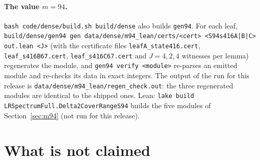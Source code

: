 \documentclass[11pt]{article}
\theoremstyle{remark}
\begin{document}
\paragraph{The value $m=94$.} \texttt{bash code/dense/build.sh build/dense} also builds \texttt{gen94}. For each leaf, \texttt{build/dense/gen94 gen data/dense/m94\_lean/certs/<cert> <S94s416A|B|C> out.lean <J>} (with the certificate files \texttt{leafA\_state416.cert}, \texttt{leaf\_s416B67.cert}, \texttt{leaf\_s416C67.cert} and $J=4,2,4$ witnesses per lemma) regenerates the module, and \texttt{gen94 verify <module>} re-parses an emitted module and re-checks its data in exact integers. The output of the run for this release is \texttt{data/dense/m94\_lean/regen\_check.out}: the three regenerated modules are identical to the shipped ones. Lean: \texttt{lake build LRSpectrumFull.Delta2CoverRangeS94} builds the five modules of Section~\ref{sec:m94} (not run for this release).

\section{What is not claimed}\label{sec:notclaimed}
\end{document}
